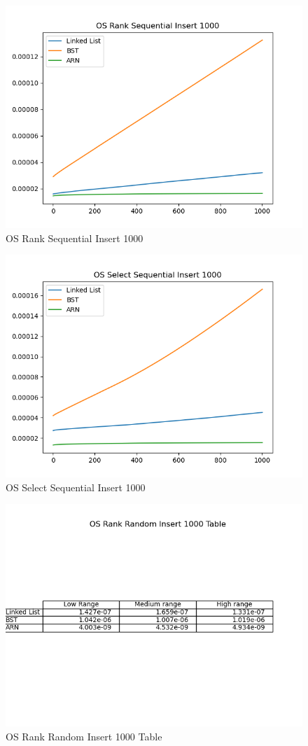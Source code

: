 \documentclass[11pt]{article}
\begin{document}
 \begin{figure}[H]
  \centering
  \includegraphics[width=0.8\linewidth]{Images/1000/OS Rank Sequential Insert 1000.png}
  \caption{OS Rank Sequential Insert 1000 }
  \label{fig:OS Rank Sequential Insert 1000}
\end{figure}
 \begin{figure}[H]
  \centering
  \includegraphics[width=0.8\linewidth]{Images/1000/OS Select Sequential Insert 1000.png}
  \caption{OS Select Sequential Insert 1000 }
  \label{fig:OS Select Sequential Insert 1000}
\end{figure}
 \begin{figure}[H]
  \centering
  \includegraphics[width=0.8\linewidth]{Images/1000/OS Rank Random Insert 1000 Table.png}
  \caption{OS Rank Random Insert 1000 Table }
  \label{fig:OS Rank Random Insert 1000 Table}
\end{figure}
\end{document}
